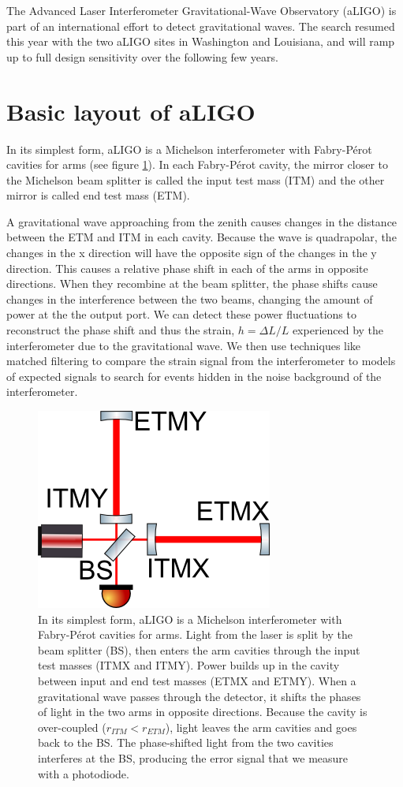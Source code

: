 The Advanced Laser Interferometer Gravitational-Wave Observatory (aLIGO) is part of an international effort to detect gravitational waves. 
The search resumed this year with the two aLIGO sites in Washington and Louisiana, and will ramp up to full design sensitivity over the following few years.

\section{Basic layout of aLIGO}

In its simplest form, aLIGO is a Michelson interferometer with Fabry-P\'erot cavities for arms (see figure \ref{fig:michelson}). In each Fabry-P\'erot cavity, the mirror closer to the Michelson beam splitter is called the input test mass (ITM) and the other mirror is called end test mass (ETM).



A gravitational wave approaching from the zenith causes changes in the distance between the ETM and ITM in each cavity. Because the wave is quadrapolar, the changes in the x direction will have the opposite sign of the changes in the y direction. This causes a relative phase shift in each of the arms in opposite directions. When they recombine at the beam splitter, the phase shifts cause changes in the interference between the two beams, changing the amount of power at the the output port. We can detect these power fluctuations to reconstruct the phase shift and thus the strain, $h=\Delta L/L$ experienced by the interferometer due to the gravitational wave. We then use techniques like matched filtering to compare the strain signal from the interferometer to models of expected signals to search for events hidden in the noise background of the interferometer. 


\begin{figure}[htp]%
\center
\includegraphics[width=.5\textwidth]{figures/introduction/Michelson}%
\caption[Simplified LIGO Layout]{In its simplest form, aLIGO is a Michelson interferometer with Fabry-P\'erot cavities for arms. Light from the laser is split by the beam splitter (BS), then enters the arm cavities through the input test masses (ITMX and ITMY). Power builds up in the cavity between input and end test masses (ETMX and ETMY). When a gravitational wave passes through the detector, it shifts the phases of light in the two arms in opposite directions. Because the cavity is over-coupled ($r_{ITM}<r_{ETM}$), light leaves the arm cavities and goes back to the BS. The phase-shifted light from the two cavities interferes at the BS, producing the error signal that we measure with a photodiode.}%
\label{fig:michelson}
\end{figure}

